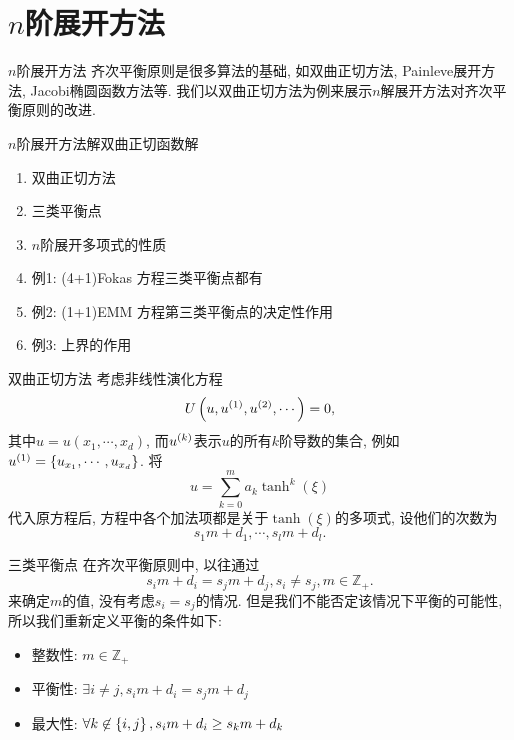\section{$n$阶展开方法}
\begin{frame}{$n$阶展开方法}
齐次平衡原则是很多算法的基础, 如双曲正切方法, Painleve展开方法, Jacobi椭圆函数方法等. 我们以双曲正切方法为例来展示$n$解展开方法对齐次平衡原则的改进. 
\end{frame}



\begin{frame}{$n$阶展开方法解双曲正切函数解}
\begin{enumerate}
\item 双曲正切方法
\item 三类平衡点
\item $n$阶展开多项式的性质
\item 例1: (4+1)Fokas 方程三类平衡点都有
\item 例2: (1+1)EMM 方程第三类平衡点的决定性作用 
\item 例3: 上界的作用
\end{enumerate}
\end{frame}

\begin{frame}{双曲正切方法}
考虑非线性演化方程 
\[
    U\left(u,u^{(1)},u^{(2)},\cdots\right)=0, 
\]
其中$u=u(x_1,\cdots,x_d)$, 而$u^{(k)}$表示$u$的所有$k$阶导数的集合, 例如$u^{(1)}=\left\{u_{x_1},\cdots,u_{x_d}\right\}$. 
将
\[
    u=\sum_{k=0}^{m}{a_k\tanh^k(\xi)}
\]
代入原方程后, 方程中各个加法项都是关于$\tanh(\xi)$的多项式, 设他们的次数为 
\[
    s_1 m+d_1,\cdots,s_l m + d_l . 
\]
\end{frame}

\begin{frame}{三类平衡点}
在齐次平衡原则中, 以往通过
\[
    s_i m+d_i=s_j m+d_j, s_i\neq s_j , m\in \mathbb Z_+. 
\]
来确定$m$的值, 没有考虑$s_i=s_j$的情况. 但是我们不能否定该情况下平衡的可能性, 所以我们重新定义平衡的条件如下:
\begin{itemize}
    \item 整数性: $ m\in \mathbb Z_+$ 
    \item 平衡性: $\exists i\neq j, s_i m+d_i=s_j m+d_j $
    \item 最大性: $\forall k \not\in \left\{i,j\right\}, s_i m+d_i\ge s_k m+d_k $
\end{itemize}
\end{frame}


